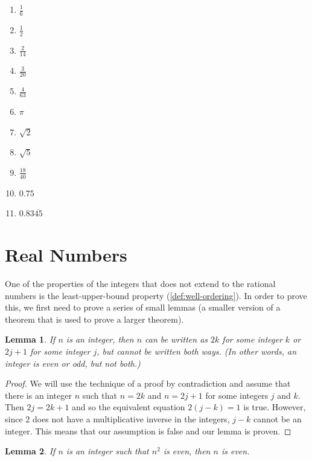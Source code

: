 \documentclass[
]{book}
\providecommand{\tightlist}{%
  \setlength{\itemsep}{0pt}\setlength{\parskip}{0pt}}
\newtheorem{lemma}{Lemma}[chapter]
\theoremstyle{definition}
\theoremstyle{definition}
\theoremstyle{definition}
\theoremstyle{definition}
\theoremstyle{remark}
\begin{document}
\begin{enumerate}
  \begin{enumerate}
  \def\labelenumii{\alph{enumii}.}
  \tightlist
  \item
    \(\frac{1}{6}\)
  \item
    \(\frac{1}{2}\)
  \item
    \(\frac{2}{14}\)
  \item
    \(\frac{3}{20}\)
  \item
    \(\frac{4}{63}\)
  \item
    \(\pi\)
  \item
    \(\sqrt{2}\)
  \item
    \(\sqrt{5}\)
  \item
    \(\frac{18}{40}\)
  \item
    \(0.75\)
  \item
    \(0.83\overline{45}\)
  \end{enumerate}
\end{enumerate}

\hypertarget{reals}{%
\section{Real Numbers}\label{reals}}

One of the properties of the integers that does not extend to the rational numbers is the least-upper-bound property (\ref{def:well-ordering}). In order to prove this, we first need to prove a series of small lemmas (a smaller version of a theorem that is used to prove a larger theorem).

\begin{lemma}
If \(n\) is an integer, then \(n\) can be written as \(2k\) for some integer \(k\) or \(2j+1\) for some integer \(j\), but cannot be written both ways. (In other words, an integer is even or odd, but not both.)
\end{lemma}

\begin{proof}
We will use the technique of a proof by contradiction and assume that there is an integer \(n\) such that \(n=2k\) and \(n=2j+1\) for some integers \(j\) and \(k\). Then \(2j=2k+1\) and so the equivalent equation \(2(j-k)=1\) is true. However, since \(2\) does not have a multiplicative inverse in the integers, \(j-k\) cannot be an integer. This means that our assumption is false and our lemma is proven.
\end{proof}

\begin{lemma}
If \(n\) is an integer such that \(n^2\) is even, then \(n\) is even.
\end{lemma}
\end{document}
